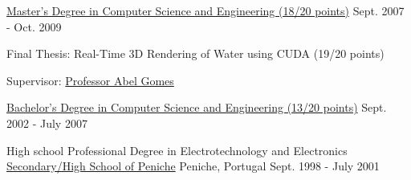 \begin{cventries}
  \cventry
    {\href{https://www.ubi.pt/en/course/804}{Master's Degree in Computer Science and Engineering (18/20 points)}} %
    {} %
    {} %
    {Sept. 2007 - Oct. 2009} %
    {
      \begin{cvitems} %
        \item {Final Thesis: Real-Time 3D Rendering of Water using CUDA (19/20 points)}
        \item {Supervisor: \href{http://www.di.ubi.pt/~agomes/}{Professor Abel Gomes}}
      \end{cvitems}
    }

  \cventry
    {\href{https://www.ubi.pt/en/course/42}{Bachelor's Degree in Computer Science and Engineering (13/20 points)}} %
    {} %
    {} %
    {Sept. 2002 - July 2007} %
    {
    }

  \cventry
    {High school Professional Degree in Electrotechnology and Electronics} %
    {\href{http://espeniche.pt/sitesp/index.php}{Secondary/High School of Peniche}} %
    {Peniche, Portugal} %
    {Sept. 1998 - July 2001} %
    {
    }

\end{cventries}
